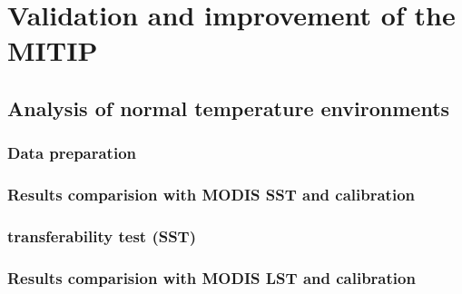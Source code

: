 \chapter{Validation and improvement of the MITIP}

\label{Chapter4}




\section{Analysis of normal temperature environments}


\subsection{Data preparation}


\subsection{Results comparision with MODIS SST and calibration}




\subsection{transferability test (SST)}


\subsection{Results comparision with MODIS LST and calibration}

